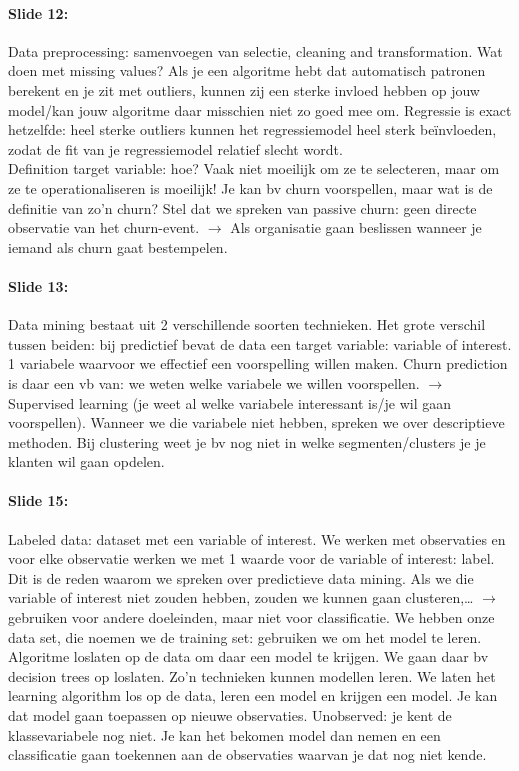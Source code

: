 \documentclass[10pt,a4paper]{report}
\begin{document}
\paragraph{Slide 12:}Data preprocessing: samenvoegen van selectie, cleaning and transformation. Wat doen met missing values? Als je een algoritme hebt dat automatisch patronen berekent en je zit met outliers, kunnen zij een sterke invloed hebben op jouw model/kan jouw algoritme daar misschien niet zo goed mee om. Regressie is exact hetzelfde: heel sterke outliers kunnen het regressiemodel heel sterk be\"invloeden, zodat de fit van je regressiemodel relatief slecht wordt.\\
Definition target variable: hoe? Vaak niet moeilijk om ze te selecteren, maar om ze te operationaliseren is moeilijk! Je kan bv churn voorspellen, maar wat is de definitie van zo'n churn? Stel dat we spreken van passive churn: geen directe observatie van het churn-event. $\rightarrow$ Als organisatie gaan beslissen wanneer je iemand als churn gaat bestempelen. 

\paragraph{Slide 13:}Data mining bestaat uit 2 verschillende soorten technieken. Het grote verschil tussen beiden: bij predictief bevat de data een target variable: variable of interest. 1 variabele waarvoor we effectief een voorspelling willen maken. Churn prediction is daar een vb van: we weten welke variabele we willen voorspellen. $\rightarrow$ Supervised learning (je weet al welke variabele interessant is/je wil gaan voorspellen). Wanneer we die variabele niet hebben, spreken we over descriptieve methoden. Bij clustering weet je bv nog niet in welke segmenten/clusters je je klanten wil gaan opdelen.

\paragraph{Slide 15:}Labeled data: dataset met een variable of interest. We werken met observaties en voor elke observatie werken we met 1 waarde voor de variable of interest: label. Dit is de reden waarom we spreken over predictieve data mining. Als we die variable of interest niet zouden hebben, zouden we kunnen gaan clusteren,… $\rightarrow$ gebruiken voor andere doeleinden, maar niet voor classificatie.
We hebben onze data set, die noemen we de training set: gebruiken we om het model te leren. Algoritme loslaten op de data om daar een model te krijgen. We gaan daar bv decision trees op loslaten. Zo'n technieken kunnen modellen leren. We laten het learning algorithm los op de data, leren een model en krijgen een model.
Je kan dat model gaan toepassen op nieuwe observaties. Unobserved: je kent de klassevariabele nog niet. Je kan het bekomen model dan nemen en een classificatie gaan toekennen aan de observaties waarvan je dat nog niet kende.
\end{document}
